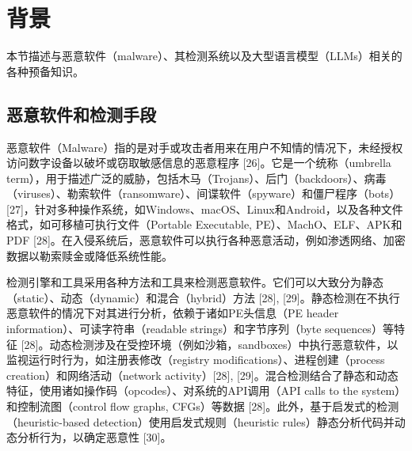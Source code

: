 
\chapter{背景}
本节描述与恶意软件（malware）、其检测系统以及大型语言模型（LLMs）相关的各种预备知识。

\section{恶意软件和检测手段}
恶意软件（Malware）指的是对手或攻击者用来在用户不知情的情况下，未经授权访问数字设备以破坏或窃取敏感信息的恶意程序 [26]。它是一个统称（umbrella term），用于描述广泛的威胁，包括木马（Trojans）、后门（backdoors）、病毒（viruses）、勒索软件（ransomware）、间谍软件（spyware）和僵尸程序（bots）[27]，针对多种操作系统，如Windows、macOS、Linux和Android，以及各种文件格式，如可移植可执行文件（Portable Executable, PE）、MachO、ELF、APK和PDF [28]。在入侵系统后，恶意软件可以执行各种恶意活动，例如渗透网络、加密数据以勒索赎金或降低系统性能。

检测引擎和工具采用各种方法和工具来检测恶意软件。它们可以大致分为静态（static）、动态（dynamic）和混合（hybrid）方法 [28], [29]。静态检测在不执行恶意软件的情况下对其进行分析，依赖于诸如PE头信息（PE header information）、可读字符串（readable strings）和字节序列（byte sequences）等特征 [28]。动态检测涉及在受控环境（例如沙箱，sandboxes）中执行恶意软件，以监视运行时行为，如注册表修改（registry modifications）、进程创建（process creation）和网络活动（network activity）[28], [29]。混合检测结合了静态和动态特征，使用诸如操作码（opcodes）、对系统的API调用（API calls to the system）和控制流图（control flow graphs, CFGs）等数据 [28]。此外，基于启发式的检测（heuristic-based detection）使用启发式规则（heuristic rules）静态分析代码并动态分析行为，以确定恶意性 [30]。
